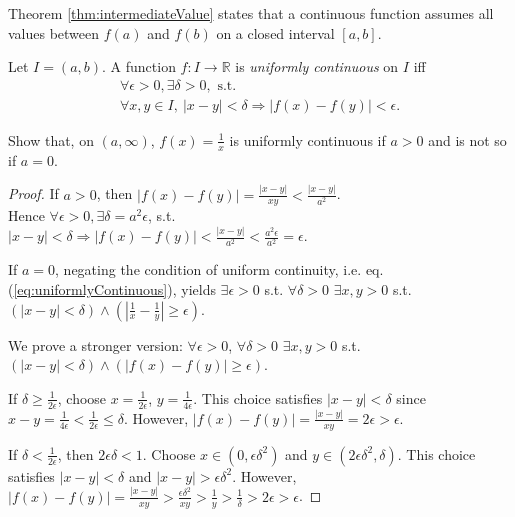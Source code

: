 \begin{rem}
Theorem \ref{thm:intermediateValue}
 states that a continuous function assumes
 all values between $f(a)$ and $f(b)$
 on a closed interval $[a,b]$.
\end{rem}

\begin{defn}
  \label{def:uniformlyContinuousScalar}
  Let $I=(a,b)$. A function $f: I\rightarrow \mathbb{R}$
  is \emph{uniformly continuous} on $I$
  iff
   \begin{equation}
     \label{eq:uniformlyContinuous}
     \begin{array}{l}
     \forall \epsilon>0, \exists \delta>0,\text{ s.t. }
     \\
     \forall x,y\in I,\ 
     |x-y|<\delta \Rightarrow |f(x)-f(y)|<\epsilon.
     \end{array}
   \end{equation}
\end{defn}

\begin{exc}
  Show that, on $(a,\infty)$,
  $f(x)=\frac{1}{x}$ is uniformly continuous
   if $a>0$ 
   and is not so if $a=0$.
\end{exc}
\begin{proof}
  If $a>0$, then
  $|f(x)-f(y)|=\frac{|x-y|}{xy} %
  <\frac{|x-y|}{a^2}$.\\
  Hence 
  $\forall \epsilon>0, \exists \delta=a^2 \epsilon$,
  s.t. \\$|x-y|<\delta \Rightarrow
  |f(x)-f(y)|<\frac{|x-y|}{a^2}<\frac{a^2 \epsilon}{a^2}=\epsilon$.

  If $a=0$, negating the condition
   of uniform continuity,
   i.e. eq. (\ref{eq:uniformlyContinuous}), yields
  $\exists \epsilon>0$ s.t. $\forall\delta>0$
   $\exists x,y>0$ s.t.
   $(|x-y|<\delta) \wedge (|\frac{1}{x}-\frac{1}{y}|\ge \epsilon)$.

   We prove a stronger version:
  $\forall \epsilon>0$, $\forall\delta>0$
   $\exists x,y>0$ s.t.
   $(|x-y|<\delta) \wedge (|f(x)-f(y)|\ge \epsilon)$.

  If $\delta\ge \frac{1}{2\epsilon}$,
   choose $x=\frac{1}{2\epsilon}$, $y=\frac{1}{4\epsilon}$.
  This choice satisfies $|x-y|<\delta$
   since $x-y=\frac{1}{4\epsilon}<\frac{1}{2\epsilon}\le \delta$.
  However, $|f(x)-f(y)|=\frac{|x-y|}{xy}=2\epsilon>\epsilon$.

  If $\delta< \frac{1}{2\epsilon}$,
   then $2\epsilon\delta<1$.
  Choose $x\in (0, \epsilon\delta^2)$
   and $y\in (2\epsilon\delta^2, \delta)$.
  This choice satisfies $|x-y|<\delta$
   and $|x-y|>\epsilon\delta^2$.
  However, 
   $|f(x)-f(y)|=\frac{|x-y|}{xy}>\frac{\epsilon\delta^2}{xy}
   > \frac{1}{y} > \frac{1}{\delta} > 2\epsilon> \epsilon$.
\end{proof}

